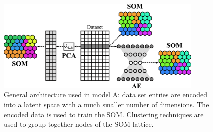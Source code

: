 \documentclass[utf8]{frontiersSCNS} %
\begin{document}
\begin{figure}[h!]
	\begin{center}
		\includegraphics[width=10cm]{architecture}%
	\end{center}
	\caption{General architecture used in model A: data set entries are encoded into a latent space with a much smaller number of dimensions. The encoded data is used to train the SOM. Clustering techniques are used to group together nodes of the SOM lattice.}\label{fig:architecture}
\end{figure}
\end{document}
